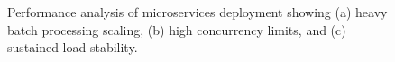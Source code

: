 \begin{figure}[htbp]
  \centering
  
  \caption{Performance analysis of microservices deployment showing (a) heavy batch processing scaling, (b) high concurrency limits, and (c) sustained load stability.}
  \label{fig:load_test_analysis}
\end{figure}